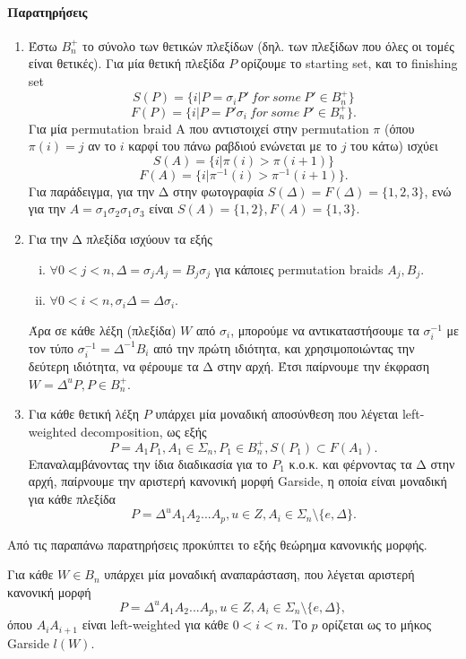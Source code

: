 \paragraph{Παρατηρήσεις}
\begin{enumerate}
\item Έστω $B_n^+$ το σύνολο των θετικών πλεξίδων (δηλ. των πλεξίδων που όλες οι τομές είναι θετικές). Για μία θετική πλεξίδα $P$ ορίζουμε το starting set, και το finishing set
\[S(P)=\{i|P=\sigma_i P'\ for\ some\ P'\in B_n^+ \}\]
\[F(P)=\{i|P=P'\sigma_i \ for\ some\ P'\in B_n^+ \}.\]
Για μία permutation braid A που αντιστοιχεί στην permutation $\pi$ (όπου $\pi(i)=j$ αν το $i$ καρφί του πάνω ραβδιού ενώνεται με το $j$ του κάτω) ισχύει 
\[S(A)=\{i|\pi(i)>\pi(i+1)\}\]
\[F(A)=\{i|\pi^{-1}(i)>\pi^{-1}(i+1)\}.\]
Για παράδειγμα, για την Δ στην φωτογραφία $S(\Delta)=F(\Delta)=\{1,2,3\}$, ενώ για την $A=\sigma_{1}\sigma_{2}\sigma_{1}\sigma_{3}$ είναι $S(A)=\{1,2\},F(A)=\{1,3\}$.

\item Για την Δ πλεξίδα ισχύουν τα εξής
	\begin{enumerate}[(i)]
	\item $\forall 0<j<n, \Delta=\sigma_j A_j=B_j \sigma_j$ για κάποιες permutation braids $A_j,B_j$.
	\item $\forall 0<i<n, \sigma_i\Delta=\Delta\sigma_i$.
	\end{enumerate}
Άρα σε κάθε λέξη (πλεξίδα) $W$ από $\sigma_i$, μπορούμε να αντικαταστήσουμε τα $\sigma_i^{-1}$ με τον τύπο $\sigma_i^{-1}=\Delta^{-1}B_i$ από την πρώτη ιδιότητα, και χρησιμοποιώντας την δεύτερη ιδιότητα, να φέρουμε τα Δ στην αρχή. Έτσι παίρνουμε την έκφραση $W=\Delta^u P, P\in B_n^+$. 

\item Για κάθε θετική λέξη $P$ υπάρχει μία μοναδική αποσύνθεση που λέγεται left-weighted decomposition, ως εξής
\[P=A_1 P_1, A_1\in\Sigma_n, P_1\in B_n^+, S(P_1)\subset F(A_1). \]
Επαναλαμβάνοντας την ίδια διαδικασία για το $P_1$ κ.ο.κ. και φέρνοντας τα Δ στην αρχή, παίρνουμε την αριστερή κανονική μορφή Garside, η οποία είναι μοναδική για κάθε πλεξίδα
\[P=\Delta^u A_1 A_2 ...A_p, u\in Z, A_{i}\in\Sigma_n\setminus\{e,\Delta\}.\] 
\end{enumerate}

Από τις παραπάνω παρατηρήσεις προκύπτει το εξής θεώρημα κανονικής μορφής.

\begin{thm} 
Για κάθε $W\in B_n$ υπάρχει μία μοναδική αναπαράσταση, που λέγεται αριστερή κανονική μορφή 
\[P=\Delta^u A_1 A_2 ...A_p, u\in Z, A_{i}\in\Sigma_n\setminus\{e,\Delta\},\] 
όπου $A_i A_{i+1}$ είναι left-weighted για κάθε $0<i<n$. Το $p$ ορίζεται ως το μήκος Garside $l(W)$. 
\end{thm}


